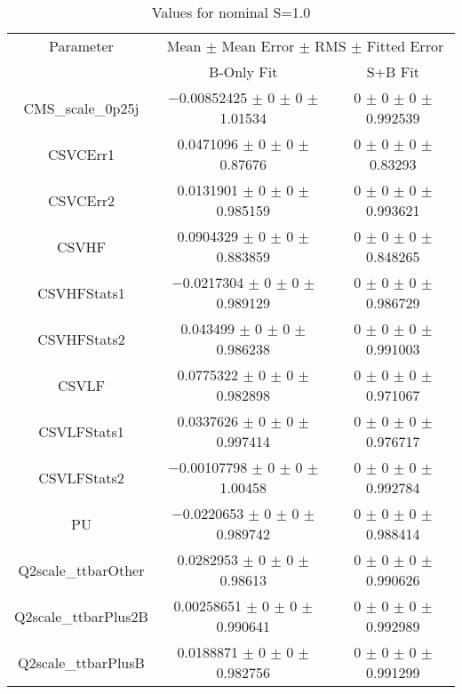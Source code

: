 \begin{table}
\centering
\caption{Values for nominal S=1.0}
\begin{tabular}{ccc}
\toprule
Parameter & \multicolumn{2}{c}{Mean $\pm$ Mean Error $\pm$ RMS $\pm$ Fitted Error}\\
 & B-Only Fit & S+B Fit\\
\midrule
CMS\_scale\_0p25j & \num{-0.00852425} $\pm$ \num{0} $\pm$ \num{0} $\pm$ \num{1.01534} & \num{0} $\pm$ \num{0} $\pm$ \num{0} $\pm$ \num{0.992539}\\
CSVCErr1 & \num{0.0471096} $\pm$ \num{0} $\pm$ \num{0} $\pm$ \num{0.87676} & \num{0} $\pm$ \num{0} $\pm$ \num{0} $\pm$ \num{0.83293}\\
CSVCErr2 & \num{0.0131901} $\pm$ \num{0} $\pm$ \num{0} $\pm$ \num{0.985159} & \num{0} $\pm$ \num{0} $\pm$ \num{0} $\pm$ \num{0.993621}\\
CSVHF & \num{0.0904329} $\pm$ \num{0} $\pm$ \num{0} $\pm$ \num{0.883859} & \num{0} $\pm$ \num{0} $\pm$ \num{0} $\pm$ \num{0.848265}\\
CSVHFStats1 & \num{-0.0217304} $\pm$ \num{0} $\pm$ \num{0} $\pm$ \num{0.989129} & \num{0} $\pm$ \num{0} $\pm$ \num{0} $\pm$ \num{0.986729}\\
CSVHFStats2 & \num{0.043499} $\pm$ \num{0} $\pm$ \num{0} $\pm$ \num{0.986238} & \num{0} $\pm$ \num{0} $\pm$ \num{0} $\pm$ \num{0.991003}\\
CSVLF & \num{0.0775322} $\pm$ \num{0} $\pm$ \num{0} $\pm$ \num{0.982898} & \num{0} $\pm$ \num{0} $\pm$ \num{0} $\pm$ \num{0.971067}\\
CSVLFStats1 & \num{0.0337626} $\pm$ \num{0} $\pm$ \num{0} $\pm$ \num{0.997414} & \num{0} $\pm$ \num{0} $\pm$ \num{0} $\pm$ \num{0.976717}\\
CSVLFStats2 & \num{-0.00107798} $\pm$ \num{0} $\pm$ \num{0} $\pm$ \num{1.00458} & \num{0} $\pm$ \num{0} $\pm$ \num{0} $\pm$ \num{0.992784}\\
PU & \num{-0.0220653} $\pm$ \num{0} $\pm$ \num{0} $\pm$ \num{0.989742} & \num{0} $\pm$ \num{0} $\pm$ \num{0} $\pm$ \num{0.988414}\\
Q2scale\_ttbarOther & \num{0.0282953} $\pm$ \num{0} $\pm$ \num{0} $\pm$ \num{0.98613} & \num{0} $\pm$ \num{0} $\pm$ \num{0} $\pm$ \num{0.990626}\\
Q2scale\_ttbarPlus2B & \num{0.00258651} $\pm$ \num{0} $\pm$ \num{0} $\pm$ \num{0.990641} & \num{0} $\pm$ \num{0} $\pm$ \num{0} $\pm$ \num{0.992989}\\
Q2scale\_ttbarPlusB & \num{0.0188871} $\pm$ \num{0} $\pm$ \num{0} $\pm$ \num{0.982756} & \num{0} $\pm$ \num{0} $\pm$ \num{0} $\pm$ \num{0.991299}\\

\end{tabular}
\end{table}
